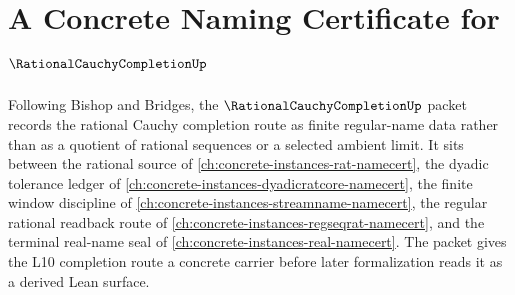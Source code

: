 \chapter{A Concrete Naming Certificate for $\RationalCauchyCompletionUp$}
\label{ch:concrete-instances-rational-cauchy-completion-namecert}

Following Bishop and Bridges, the $\RationalCauchyCompletionUp$ packet records the rational Cauchy completion route as finite regular-name data rather than as a quotient of rational sequences or a selected ambient limit. It sits between the rational source of \autoref{ch:concrete-instances-rat-namecert}, the dyadic tolerance ledger of \autoref{ch:concrete-instances-dyadicratcore-namecert}, the finite window discipline of \autoref{ch:concrete-instances-streamname-namecert}, the regular rational readback route of \autoref{ch:concrete-instances-regseqrat-namecert}, and the terminal real-name seal of \autoref{ch:concrete-instances-real-namecert}. The packet gives the L10 completion route a concrete carrier before later formalization reads it as a derived Lean surface.

